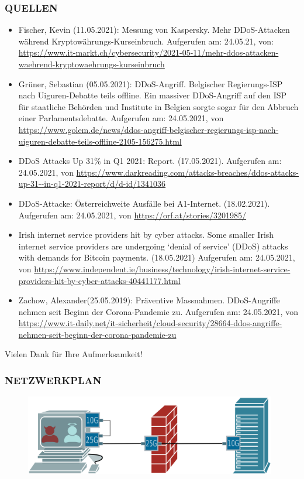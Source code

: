 \documentclass{beamer}
\begin{document}
\begin{frame}
    \frametitle{QUELLEN}
    \begin{itemize}
        \tiny
        \item Fischer, Kevin (11.05.2021): Messung von Kaspersky.
              Mehr DDoS-Attacken während Kryptowährungs-Kurseinbruch. Aufgerufen am: 24.05.21, von: \url{https://www.it-markt.ch/cybersecurity/2021-05-11/mehr-ddos-attacken-waehrend-kryptowaehrungs-kurseinbruch}
        \item Grüner, Sebastian (05.05.2021): DDoS-Angriff. Belgischer Regierungs-ISP nach Uiguren-Debatte teils offline.
              Ein massiver DDoS-Angriff auf den ISP für staatliche Behörden und Institute in Belgien sorgte sogar für den Abbruch einer Parlamentsdebatte. Aufgerufen am: 24.05.2021, von \url{https://www.golem.de/news/ddos-angriff-belgischer-regierungs-isp-nach-uiguren-debatte-teils-offline-2105-156275.html}
        \item DDoS Attacks Up 31\% in Q1 2021: Report. (17.05.2021). Aufgerufen am: 24.05.2021, von \url{https://www.darkreading.com/attacks-breaches/ddos-attacks-up-31--in-q1-2021-report/d/d-id/1341036}
        \item DDoS-Attacke: Österreichweite Ausfälle bei A1-Internet. (18.02.2021). Aufgerufen am: 24.05.2021, von \url{https://orf.at/stories/3201985/}
        \item Irish internet service providers hit by cyber attacks.
              Some smaller Irish internet service providers are undergoing ‘denial of service’ (DDoS) attacks with demands for Bitcoin payments. (18.05.2021) Aufgerufen am: 24.05.2021, von \url{https://www.independent.ie/business/technology/irish-internet-service-providers-hit-by-cyber-attacks-40441177.html}
        \item Zachow, Alexander(25.05.2019): Präventive Massnahmen.
              DDoS-Angriffe nehmen seit Beginn der Corona-Pandemie zu. Aufgerufen am: 24.05.2021, von \url{https://www.it-daily.net/it-sicherheit/cloud-security/28664-ddos-angriffe-nehmen-seit-beginn-der-corona-pandemie-zu}
    \end{itemize}
\end{frame}

\begin{frame}
    \begin{center}
        Vielen Dank für Ihre Aufmerksamkeit!
    \end{center}
\end{frame}

\begin{frame}
    \frametitle{NETZWERKPLAN}
    \begin{figure}[ht]
        \centering
        \includegraphics[width=11cm]{img/netzwerkplan.png}
    \end{figure}
\end{frame}
\end{document}
